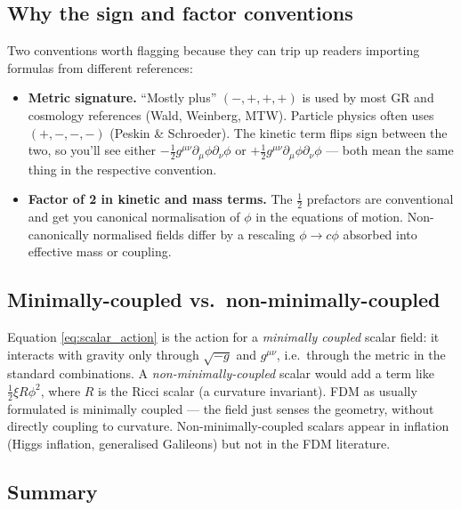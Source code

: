 \documentclass[12pt]{article}
\begin{document}
\subsection{Why the sign and factor conventions}
\label{app:conventions}

Two conventions worth flagging because they can trip up readers
importing formulas from different references:
%
\begin{itemize}
  \item \textbf{Metric signature.}  ``Mostly plus'' $(-,+,+,+)$ is
        used by most GR and cosmology references (Wald, Weinberg,
        MTW).  Particle physics often uses $(+,-,-,-)$ (Peskin \&
        Schroeder).  The kinetic term flips sign between the two,
        so you'll see either $-\tfrac{1}{2}g^{\mu\nu}\partial_\mu\phi\partial_\nu\phi$
        or $+\tfrac{1}{2}g^{\mu\nu}\partial_\mu\phi\partial_\nu\phi$ ---
        both mean the same thing in the respective convention.
  \item \textbf{Factor of 2 in kinetic and mass terms.}
        The $\tfrac{1}{2}$ prefactors are conventional and get you
        canonical normalisation of $\phi$ in the equations of motion.
        Non-canonically normalised fields differ by a rescaling
        $\phi\to c\phi$ absorbed into effective mass or coupling.
\end{itemize}

\subsection{Minimally-coupled vs.\ non-minimally-coupled}
\label{app:minimal}

Equation \eqref{eq:scalar_action} is the action for a
\emph{minimally coupled} scalar field: it interacts with gravity
only through $\sqrt{-g}$ and $g^{\mu\nu}$, i.e.\ through the metric
in the standard combinations.  A \emph{non-minimally-coupled} scalar
would add a term like $\tfrac{1}{2}\xi R\phi^2$, where $R$ is the
Ricci scalar (a curvature invariant).  FDM as usually formulated is
minimally coupled --- the field just senses the geometry, without
directly coupling to curvature.  Non-minimally-coupled scalars
appear in inflation (Higgs inflation, generalised Galileons) but
not in the FDM literature.

\subsection{Summary}
\label{app:qft_summary}
\end{document}
